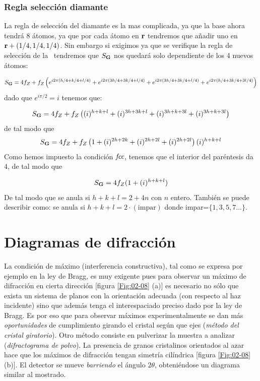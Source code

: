 \subsubsection{Regla selección diamante}

La regla de selección del diamante es la mas complicada, ya que la base ahora tendrá 8 átomos, ya que por cada átomo en $\mathbf{r}$ tendremos que añadir uno en $\mathbf{r}+(1/4,1/4,1/4)$. Sin embargo si exigimos ya que se verifique la regla de selección de la \fcc \ tendremos que $S_{\mathbf{G}}$ nos quedará solo dependiente de los 4 nuevos átomos:


\begin{equation*}
	S_{\mathbf{G}} = 4f_Z +  f_Z  \left( e^{i2\pi(h/4+k/4+l/4)}+e^{i2\pi(3h/4+3k/4+l/4)}+e^{i2\pi(3h/4+3k/4+l/4)}+e^{i2\pi(h/4+3k/4+3l/4)} \right)
\end{equation*}
dado que $e^{i\pi/2}=i$ tenemos que:

\begin{equation*}
	S_{\mathbf{G}} = 4 f_Z + f_Z \left( (i)^{h+k+l}+(i)^{3h+3k+l}+(i)^{3h+k+3l}+(i)^{3h+k+3l} \right)
\end{equation*}
de tal modo que
\begin{equation*}
	S_{\mathbf{G}} = 4 f_Z  + f_Z \left( 1+(i)^{2h+2k}+(i)^{2h+2l}+(i)^{2h+2l} \right)(i)^{h+k+l}
\end{equation*}
Como hemos impuesto la condición $\textit{fcc}$, tenemos que el interior del paréntesis da 4, de tal modo que

\begin{equation*}
	S_{\mathbf{G}} = 4 f_Z (1+(i)^{h+k+l})
\end{equation*}
De tal modo que se anula si $h+k+l=2+4n$ con $n$ entero. También se puede describir como: se anula si $h+k+l=2\cdot(\text{impar})$ donde impar=$\{1,3,5,7...\}$.



\section{Diagramas de difracción}

La condición de máximo (interferencia constructiva), tal como se expresa por ejemplo en la ley de Bragg, es muy exigente pues para observar un máximo de difracción en cierta dirección [figura \ref{Fig:02-08} (a)] es necesario no sólo que exista un sistema de planos con la orientación adecuada (con respecto al haz incidente) sino que además tenga el interespaciado preciso dado por la ley de Bragg. Es por eso que para observar máximos experimentalmente se dan más \textit{oportunidades} de cumplimiento girando el cristal según que ejes (\textit{método del cristal giratorio}). Otro método consiste en pulverizar la muestra a analizar (\textit{difractograma de polvo}). La presencia de granos cristalinos orientados al azar hace que los máximos de difracción tengan simetría cilíndrica [figura \ref{Fig:02-08} (b)]. El detector se mueve \textit{barriendo} el ángulo $2\theta$, obteniéndose un diagrama similar al mostrado. 

